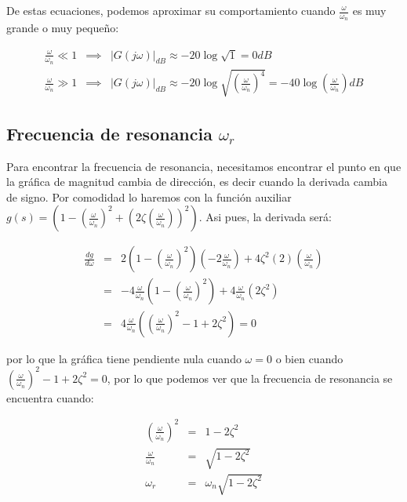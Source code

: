         De estas ecuaciones, podemos aproximar su comportamiento cuando $\frac{\omega}{\omega_n}$ es muy grande o muy pequeño:

        \begin{eqnarray*}
            \frac{\omega}{\omega_n} \ll 1 & \implies & \left| G(j \omega) \right|_{dB} \approx -20 \log{\sqrt{1}} = 0 dB \\
            \frac{\omega}{\omega_n} \gg 1 & \implies & \left| G(j \omega) \right|_{dB} \approx -20 \log{\sqrt{\left( \frac{\omega}{\omega_n} \right)^4}} = -40 \log{\left( \frac{\omega}{\omega_n} \right)} dB
        \end{eqnarray*}


        \subsection{Frecuencia de resonancia $\omega_r$}

            Para encontrar la frecuencia de resonancia, necesitamos encontrar el punto en que la gráfica de magnitud cambia de dirección, es decir cuando la derivada cambia de signo. Por comodidad lo haremos con la función auxiliar $g(s) = \left( 1 - \left( \frac{\omega}{\omega_n} \right)^2 + \left( 2 \zeta \left( \frac{\omega}{\omega_n} \right) \right)^2 \right)$. Asi pues, la derivada será:

            \begin{eqnarray*}
                \frac{d g}{d \omega} & = & 2 \left( 1 - \left( \frac{\omega}{\omega_n} \right)^2 \right) \left( -2 \frac{\omega}{\omega_n} \right) + 4 \zeta^2 (2) \left( \frac{\omega}{\omega_n} \right) \\
                & = & -4 \frac{\omega}{\omega_n} \left( 1 - \left( \frac{\omega}{\omega_n} \right)^2 \right) + 4 \frac{\omega}{\omega_n} \left( 2 \zeta^2 \right) \\
                & = & 4 \frac{\omega}{\omega_n} \left( \left( \frac{\omega}{\omega_n} \right)^2 - 1 + 2 \zeta^2 \right) = 0
            \end{eqnarray*}

            por lo que la gráfica tiene pendiente nula cuando $\omega = 0$ o bien cuando $\left( \frac{\omega}{\omega_n} \right)^2 - 1 + 2 \zeta^2 = 0$, por lo que podemos ver que la frecuencia de resonancia se encuentra cuando:

            \begin{eqnarray*}
                \left( \frac{\omega}{\omega_n} \right)^2 & = & 1 - 2 \zeta^2 \\
                \frac{\omega}{\omega_n} & = & \sqrt{1 - 2 \zeta^2} \\
                \omega_r & = & \omega_n \sqrt{1 - 2 \zeta^2}
            \end{eqnarray*}

